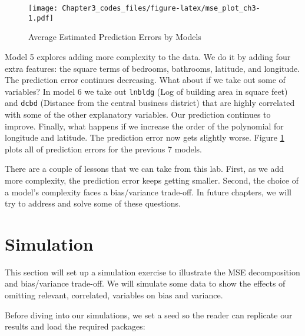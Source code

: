 \begin{figure}[H]
    \centering
    \caption{Average Estimated Prediction Errors by Models}\label{fig:mse_ch3}
\texttt{[image: Chapter3\_codes\_files/figure-latex/mse\_plot\_ch3-1.pdf]}
\end{figure}

\noindent Model 5 explores adding more complexity to the data. We do it by adding four extra features: the square terms of bedrooms, bathrooms, latitude, and longitude. The prediction error continues decreasing. What about if we take out some of variables? In model 6 we take out  \texttt{lnbldg} (Log of building area in square feet) and  \texttt{dcbd} (Distance from the central business district) that are highly correlated with some of the other explanatory variables. Our prediction continues to improve.  Finally, what happens if we increase the order of the polynomial for longitude and latitude. The prediction error now gets slightly worse. Figure \ref{fig:mse_ch3} plots all of prediction errors for the previous 7 models.

There are a couple of lessons that we can take from this lab. First, as we add more complexity, the prediction error keeps getting smaller. Second, the choice of a model's complexity faces a bias/variance trade-off.  In future chapters, we will try to address and solve some of these questions.



\section{Simulation}


This section will set up a simulation exercise to illustrate the MSE
decomposition and bias/variance trade-off. We will simulate some data to
show the effects of omitting relevant, correlated, variables on bias and
variance.

Before diving into our simulations, we set a seed so the reader can
replicate our results and load the required packages:

\begin{Shaded}
\begin{Highlighting}[]
\NormalTok{(}\NormalTok{) }
\NormalTok{(}\NormalTok{) }
\NormalTok{(}\NormalTok{) }
\NormalTok{(}\NormalTok{) }
\end{Highlighting}
\end{Shaded}

